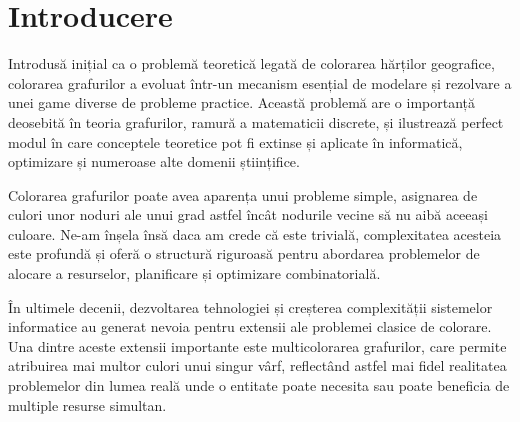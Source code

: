 \chapter*{Introducere} 

Introdusă inițial ca o problemă teoretică legată de colorarea hărților geografice, colorarea grafurilor a evoluat într-un mecanism esențial de modelare și rezolvare a unei game diverse de probleme practice. Această problemă are o importanță deosebită în teoria grafurilor, ramură a matematicii discrete, și ilustrează perfect modul în care conceptele teoretice pot fi extinse și aplicate în informatică, optimizare și numeroase alte domenii științifice.
   
Colorarea grafurilor poate avea aparența unui probleme simple, asignarea de culori unor noduri ale unui grad astfel încât nodurile vecine să nu aibă aceeași culoare. Ne-am înșela însă daca am crede că este trivială, complexitatea acesteia este profundă și oferă o structură riguroasă pentru abordarea problemelor de alocare a resurselor, planificare și optimizare combinatorială.

În ultimele decenii, dezvoltarea tehnologiei și creșterea complexității sistemelor informatice au generat nevoia pentru extensii ale problemei clasice de colorare. Una dintre aceste extensii importante este multicolorarea grafurilor, care permite atribuirea mai multor culori unui singur vârf, reflectând astfel mai fidel realitatea problemelor din lumea reală unde o entitate poate necesita sau poate beneficia de multiple resurse simultan.